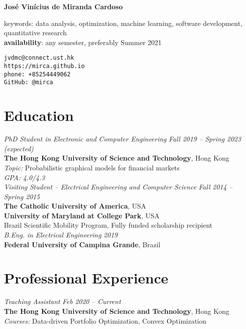 \documentclass[10pt]{article}
\begin{document}
\pagestyle{empty}
\begin{titlepage}
     {\Large{\textbf{Jos\'e Vin\'icius de Miranda Cardoso}}}
     \vspace{.5cm}

    \begin{minipage}[b]{9cm}
      keywords: data analysis, optimization, machine learning, software development, quantitative research\\
      \textbf{availability}: any semester, preferably Summer 2021
    \end{minipage}
    \hfill
    \begin{minipage}[b]{5cm}
        \texttt{jvdmc@connect.ust.hk}\\
        \texttt{https://mirca.github.io}\\
        \texttt{phone: +85254449062}\\
        \texttt{GitHub: @mirca}
    \end{minipage}


\section*{Education}

\emph{PhD Student in Electronic and Computer Engineering} \hfill \textit{Fall 2019 -- Spring 2023 (expected)} \\
\textbf{The Hong Kong University of Science and Technology}, Hong Kong\\
\textit{Topic:} Probabilistic graphical models for financial markets\\
\textit{GPA: 4.0/4.3}\\

\emph{Visiting Student -- Electrical Engineering and Computer Science} \hfill \textit{Fall 2014 -- Spring 2015} \\
\textbf{The Catholic University of America}, USA\\
\textbf{University of Maryland at College Park}, USA \\
Brazil Scientific Mobility Program, Fully funded scholarship recipient \\

\emph{B.Eng. in Electrical Engineering} \hfill \textit{2019} \\
\textbf{Federal University of Campina Grande}, Brazil

\section*{Professional Experience}
\emph{Teaching Assistant} \hfill \textit{Feb 2020 -- Current}
\\ \textbf{The Hong Kong University of Science and Technology}, Hong Kong
\\ {\small\textit{Courses:} Data-driven Portfolio Optimization, Convex Optimization}
\vspace{.5cm}


\end{titlepage}
\end{document}
